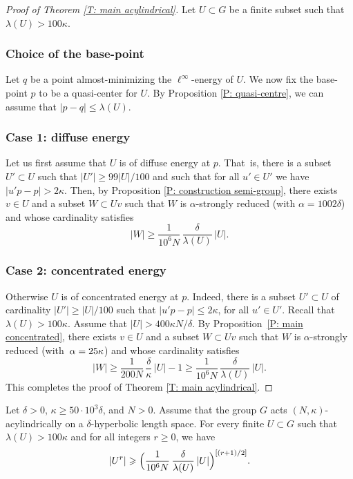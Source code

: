 \begin{proof}[Proof of Theorem \ref{T: main acylindrical}]
Let $U\subset G$ be a finite subset such that $\lambda(U)>100\kappa$.

\subsubsection*{Choice of the base-point} Let $q$ be a point almost-minimizing the $\ell^{\infty}$-energy of $U$. We now fix the base-point $p$ to be a quasi-center for $U$. By Proposition \ref{P: quasi-centre}, we can assume that $|p-q|\leqslant \lambda(U)$.

\subsubsection*{Case 1: diffuse energy} Let us first assume that $U$ is of diffuse energy at $p$. That~is, there is a subset $U'\subset U$ such that $|U'|\geqslant 99|U|/100$ and such that for all $u'\in U'$ we have $|u'p-p|>2\kappa$.
Then, by Proposition \ref{P: construction semi-group}, there exists $v \in U$ and a subset $W \subset Uv$ such that $W$ is $\alpha$-strongly reduced (with $\alpha = 1002\delta$) and whose cardinality satisfies
\begin{equation*}
|W| \geq \frac 1{10^6N}\,\frac \delta{\lambda(U)}\, |U|.
\end{equation*}

\subsubsection*{Case 2: concentrated energy} Otherwise $U$ is of concentrated energy at $p$. Indeed, there is a subset $U'\subset U$ of cardinality $|U'|\geqslant |U|/100$ such that $|u'p-p|\leqslant 2\kappa$, for all $u'\in U'$.
Recall that $\lambda(U) > 100\kappa$.
Assume that $|U| > 400\kappa N /\delta$.
By Proposition~\ref{P: main concentrated}, there exists $v \in U$ and a subset $W \subset Uv$ such that $W$ is $\alpha$-strongly reduced (with~$\alpha =\nobreak 25\kappa$) and whose cardinality satisfies
\begin{equation*}
|W| \geq \frac 1{200N}\,\frac \delta{\kappa}\, |U|-1 \geq \frac 1{10^6N}\,\frac \delta{\lambda(U)}\, |U|.
\end{equation*}
This completes the proof of Theorem \ref{T: main acylindrical}. \end{proof}

\begin{cor}\label{T: acylindrical}
Let $\delta >0$, $\kappa\geqslant 50\cdot 10^3\delta$, and $N>0$.
Assume that the group $G$ acts $(N,\kappa)$-acylindrically on a $\delta$-hyperbolic length space.
For every finite $U\subset G$ such that $\lambda(U)> 100\kappa$ and for all integers $r\geqslant 0$, we have
\[
|U^r|\geqslant \Bigl( \frac 1{10^6N}\,\frac \delta{\lambda(U)}\, |U| \Bigr)^{[(r+1)/2]} .
\]
\end{cor}

